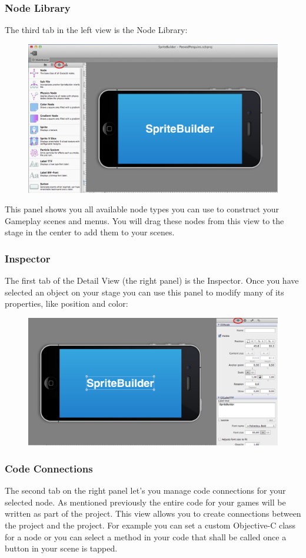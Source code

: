 \subsubsection{Node Library}
The third tab in the left view is the {Node Library}:
\begin{figure}[H]
		\centering
		\includegraphics[width=0.8\linewidth]{images/spritebuilder/spritebuilder_nodeview.png}     
\end{figure} 
This panel shows you all available node types you can use to construct your
Gameplay scenes and menus. You will drag these nodes from this view to the stage
in the center to add them to your scenes.

\subsubsection{Inspector}
The first tab of the Detail View (the right panel) is
the Inspector. Once you have selected an object on your stage you can use this panel to modify many of its properties, like position and color:
\begin{figure}[H]
		\centering
		\includegraphics[width=0.8\linewidth]{images/spritebuilder/spritebuilder_inspector.png}     
\end{figure} 

\subsubsection{Code Connections} 
The second tab on the right panel let's you manage code connections for your
selected node. As mentioned previously the entire code for your games will be
written as part of the \xcode{} project. This view allows you to create
connections between the \xcode{} project and the \SB{} project. For example you can set a custom Objective-C class for a node or you can select
a method in your code that shall be called once a button in your scene is tapped. 

